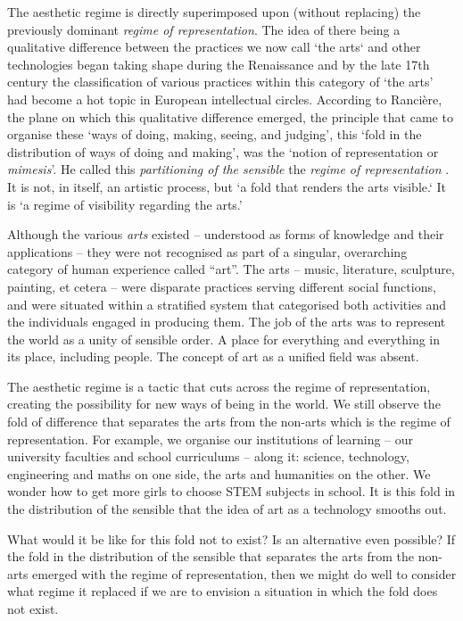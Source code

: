 \documentclass[letterpaper]{article}
\begin{document}
    The aesthetic regime is directly superimposed upon (without replacing) the previously dominant \emph{regime of representation}. The idea of there being a qualitative difference between the practices we now call ‘the arts‘ and other technologies began taking shape during the Renaissance \citep[p.136]{TatarkiewiczWhtIsArt1971} and by the late 17th century the classification of various practices within this category of ‘the arts’ had become a hot topic in European intellectual circles. According to Rancière, the plane on which this qualitative difference emerged, the principle that came to organise these ‘ways of doing, making, seeing, and judging’, this ‘fold in the distribution of ways of doing and making’, was the ‘notion of representation or \emph{mimesis}’. He called this \emph{partitioning of the sensible} the \emph{regime of representation} \citep[p.22]{RancierPltcsOfThAsthtcs2004}. It is not, in itself, an artistic process, but ‘a fold that renders the arts visible.‘ It is  ‘a regime of visibility regarding the arts.’
    
    Although the various \emph{arts} existed – understood as forms of knowledge and their applications – they were not recognised as part of a singular, overarching category of human experience called “art”. The arts – music, literature, sculpture, painting, et cetera – were disparate practices serving different social functions, and were situated within a stratified system that categorised both activities and the individuals engaged in producing them. The job of the arts was to represent the world as a unity of sensible order. A place for everything and everything in its place, including people. The concept of art as a unified field was absent.
    
    The aesthetic regime is a tactic that cuts across the regime of representation, creating the possibility for new ways of being in the world. We still observe the fold of difference that separates the arts from the non-arts which is the regime of representation. For example, we organise our institutions of learning – our university faculties and school curriculums – along it: science, technology, engineering and maths on one side, the arts and humanities on the other. We wonder how to get more girls to choose STEM subjects in school. It is this fold in the distribution of the sensible that the idea of art as a technology smooths out.
    
    What would it be like for this fold not to exist? Is an alternative even possible? If the fold in the distribution of the sensible that separates the arts from the non-arts emerged with the regime of representation, then we might do well to consider what regime it replaced if we are to envision a situation in which the fold does not exist.
    
\end{document}
